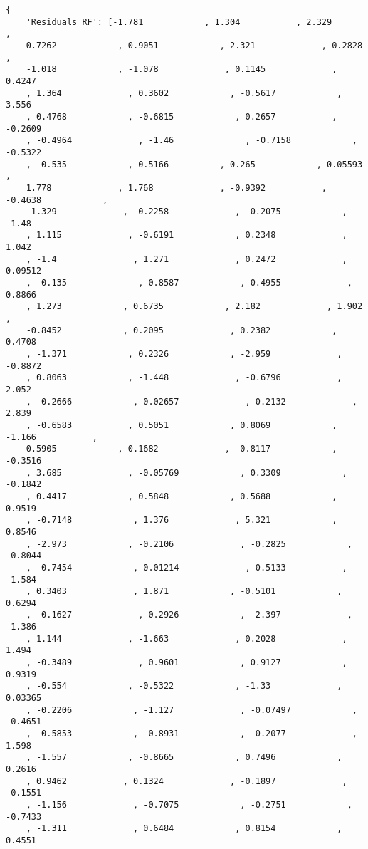\documentclass[11pt]{article}
\begin{document}
\begin{Verbatim}[tabsize=4]
{
    'Residuals RF': [-1.781            , 1.304           , 2.329             ,
	0.7262            , 0.9051            , 2.321             , 0.2828            ,
	-1.018            , -1.078             , 0.1145             , 0.4247
	, 1.364             , 0.3602            , -0.5617            , 3.556
	, 0.4768            , -0.6815            , 0.2657           , -0.2609
	, -0.4964             , -1.46              , -0.7158            , -0.5322
	, -0.535            , 0.5166          , 0.265            , 0.05593             ,
	1.778             , 1.768             , -0.9392           , -0.4638            ,
	-1.329             , -0.2258             , -0.2075            , -1.48
	, 1.115             , -0.6191            , 0.2348             , 1.042
	, -1.4               , 1.271             , 0.2472             , 0.09512
	, -0.135              , 0.8587            , 0.4955             , 0.8866
	, 1.273            , 0.6735            , 2.182             , 1.902             ,
	-0.8452            , 0.2095             , 0.2382            , 0.4708
	, -1.371            , 0.2326            , -2.959             , -0.8872
	, 0.8063            , -1.448             , -0.6796           , 2.052
	, -0.2666            , 0.02657             , 0.2132             , 2.839
	, -0.6583           , 0.5051            , 0.8069            , -1.166           ,
	0.5905            , 0.1682             , -0.8117            , -0.3516
	, 3.685             , -0.05769            , 0.3309            , -0.1842
	, 0.4417            , 0.5848            , 0.5688            , 0.9519
	, -0.7148            , 1.376             , 5.321            , 0.8546
	, -2.973            , -0.2106             , -0.2825            , -0.8044
	, -0.7454            , 0.01214             , 0.5133           , -1.584
	, 0.3403             , 1.871            , -0.5101            , 0.6294
	, -0.1627             , 0.2926            , -2.397             , -1.386
	, 1.144             , -1.663             , 0.2028             , 1.494
	, -0.3489             , 0.9601            , 0.9127            , 0.9319
	, -0.554            , -0.5322            , -1.33             , 0.03365
	, -0.2206            , -1.127             , -0.07497            , -0.4651
	, -0.5853            , -0.8931            , -0.2077             , 1.598
	, -1.557            , -0.8665            , 0.7496            , 0.2616
	, 0.9462           , 0.1324             , -0.1897             , -0.1551
	, -1.156             , -0.7075            , -0.2751            , -0.7433
	, -1.311             , 0.6484            , 0.8154            , 0.4551

\end{Verbatim}
\end{document}
